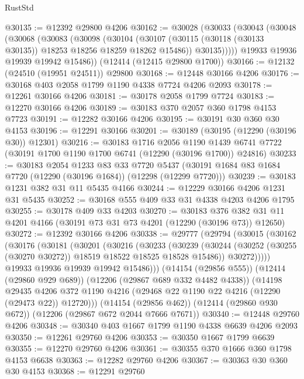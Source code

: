 \begin{lexlean}{RustStd}
\begin{coremodule}
{\begin{coremodule}
{{{{{{{{{{{{{{{{{{{{{{{{{{{{{{{{{{{{{{{{{{{{{{{{{{@30135 := @12392 @29800 @4206
@30162 := @30028
    (@30033
      (@30043
        (@30048
          (@30068
            (@30083
              (@30098
                (@30104
                  (@30107 (@30115 (@30118 (@30133 @30135)) @18253 @18256 @18259 @18262 @15486))
                  @30135)))))
        @19933
        @19936
        @19939
        @19942
        @15486))
    (@12414 (@12415 @29800 @1700))
@30166 := @12132 (@24510 (@19951 @24511)) @29800
@30168 := @12448 @30166 @4206
@30176 := @30168 @403 @2058 @1799 @1190 @4338 @7724 @4206 @2093
@30178 := @12261 @30166 @4206
@30181 := @30178 @2058 @1799 @7724
@30183 := @12270 @30166 @4206
@30189 := @30183 @370 @2057 @360 @1798 @4153 @7723
@30191 := @12282 @30166 @4206
@30195 := @30191 @30 @360 @30 @4153
@30196 := @12291 @30166
@30201 := @30189 (@30195 (@12290 (@30196 @30)) @12301)
@30216 := @30183
    @1716
    @2056
    @1190
    @1439
    @6741
    @7722
    (@30191 @1700 @1190 @1700 @6741 (@12290 (@30196 @1700)) @24816)
@30233 := @30183
    @2054
    @1233
    @83
    @33
    @7720
    @5437
    (@30191 @1684 @83 @1684 @7720 (@12290 (@30196 @1684)) (@12298 (@12299 @7720)))
@30239 := @30183 @1231 @382 @31 @11 @5435 @4166
@30244 := @12229 @30166 @4206 @1231 @31 @5435
@30252 := @30168 @555 @409 @33 @31 @4338 @4203 @4206 @1795
@30255 := @30178 @409 @33 @4203
@30270 := @30183
    @376
    @382
    @31
    @11
    @4201
    @4166
    (@30191 @73 @31 @73 @4201 (@12290 (@30196 @73)) @12650)
@30272 := @12392 @30166 @4206
@30338 := @29777
    (@29794
      (@30015
        (@30162
          (@30176
            (@30181
              (@30201
                (@30216
                  (@30233
                    (@30239
                      (@30244 (@30252 (@30255 (@30270 @30272)) @18519 @18522 @18525 @18528 @15486))
                      @30272)))))
            @19933
            @19936
            @19939
            @19942
            @15486)))
      (@14154 (@29856 @555))
      (@12414 (@29860 @929 @689))
      (@12206 (@29867 @689 @332 @4482 @4338))
      (@14198
        @29435
        @4206
        @372
        @1190
        @4216
        (@29468 @22 @1190 @22 @4216 (@12290 (@29473 @22)) @12720)))
    (@14154 (@29856 @462))
    (@12414 (@29860 @930 @672))
    (@12206 (@29867 @672 @2044 @7666 @7671))
@30340 := @12448 @29760 @4206
@30348 := @30340 @403 @1667 @1799 @1190 @4338 @6639 @4206 @2093
@30350 := @12261 @29760 @4206
@30353 := @30350 @1667 @1799 @6639
@30355 := @12270 @29760 @4206
@30361 := @30355 @370 @1666 @360 @1798 @4153 @6638
@30363 := @12282 @29760 @4206
@30367 := @30363 @30 @360 @30 @4153
@30368 := @12291 @29760
}}}}}}}}}}}}}}}}}}}}}}}}}}}}}}}}}}}}}}}}}}}}}}}}}}
\end{coremodule}}
\end{coremodule}
\end{lexlean}
